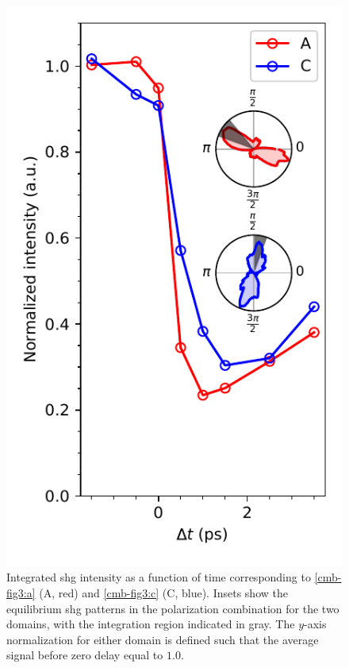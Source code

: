 \begin{figure}
\centering
\includegraphics{./gfx/ch6/quenchtimes.pdf}
\captionsetup{singlelinecheck=off}
\caption[]{
\label{cmb-quenchtimes}
Integrated \gls{shg} intensity as a function of time corresponding to \cref{cmb-fig3:a} (A, red) and \cref{cmb-fig3:c} (C, blue).
Insets show the equilibrium \gls{shg} patterns in the \PP polarization combination for the two domains, with the integration region indicated in gray.
The $y$-axis normalization for either domain is defined such that the average signal before zero delay equal to $1.0$.
}
\end{figure}


